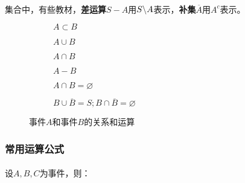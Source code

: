 \paragraph{}
集合中，有些教材，\textbf{差运算}$S - A$用$S \symbol{92} A$表示，\textbf{补集}$\overline{A}$用$A^{c}$表示。

\begin{figure}[h]
\centering
  \begin{subfigure}[t]{0.3\linewidth}
    \centering
      
      \caption{$A \subset B$}
      \label{1_A_subset_B}
  \end{subfigure}
  \begin{subfigure}[t]{0.3\linewidth}
    \centering
      
      \caption{$A \cup B$}
      \label{1_A_cup_B}
  \end{subfigure}
  \begin{subfigure}[t]{0.3\linewidth}
    \centering
      
      \caption{$A \cap B$}
      \label{1_A_cap_B}
  \end{subfigure}

  \bigskip %
  \begin{subfigure}[b]{0.3\linewidth}
    \centering
      
      \caption{$A - B$}
      \label{1_A_diffence_B}
  \end{subfigure}
  \begin{subfigure}[b]{0.3\linewidth}
    \centering
      
      \caption{$A \cap B = \varnothing$}
      \label{1_A_cap_nothing_B}
  \end{subfigure}
  \begin{subfigure}[b]{0.3\linewidth}
    \centering
      
      \caption{$B \cup \overline{B} = S; B \cap \overline{B} = \varnothing$}
      \label{1_B_complement}
  \end{subfigure}
  \caption{事件$A$和事件$B$的关系和运算}
  \label{事件A和事件B的关系和运算}
\end{figure}

\subsubsection{常用运算公式}
\paragraph{}
设$A, B, C$为事件，则：


